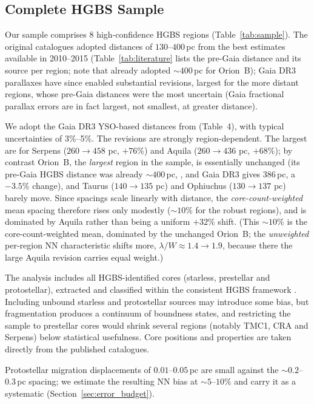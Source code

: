 \documentclass[usenatbib,twoside,twocolumn]{mnras}
\begin{document}
\subsection{Complete HGBS Sample}

Our sample comprises 8 high-confidence HGBS regions (Table~\ref{tab:sample}). The original catalogues \citep{Konyves2015, Konyves2020, Ladjelate2020, Pezzuto2021} adopted distances of $130$--$400$\,pc from the best estimates available in 2010--2015 (Table~\ref{tab:literature} lists the pre-Gaia distance and its source per region; note that \citealt{Konyves2020} already adopted $\sim400$\,pc for Orion~B); Gaia DR3 parallaxes \citep{Zhang2023} have since enabled substantial revisions, largest for the more distant regions, whose pre-Gaia distances were the most uncertain (Gaia fractional parallax errors are in fact largest, not smallest, at greater distance).

We adopt the Gaia DR3 YSO-based distances from \citet{Zhang2023} (Table~4), with typical uncertainties of 3\%--5\%. The revisions are strongly region-dependent. The largest are for Serpens ($260 \to 458$ pc, $+76\%$) and Aquila ($260 \to 436$ pc, $+68\%$); by contrast Orion~B, the \emph{largest} region in the sample, is essentially unchanged (its pre-Gaia HGBS distance was already $\sim400$\,pc, \citealt{Konyves2020}, and Gaia DR3 gives $386$\,pc, a $-3.5\%$ change), and Taurus ($140 \to 135$ pc) and Ophiuchus ($130 \to 137$ pc) barely move. Since spacings scale linearly with distance, the \emph{core-count-weighted} mean spacing therefore rises only modestly ($\sim10\%$ for the robust regions), and is dominated by Aquila rather than being a uniform $+32\%$ shift. (This $\sim10\%$ is the core-count-weighted mean, dominated by the unchanged Orion~B; the \emph{unweighted} per-region NN characteristic shifts more, $\lambda/W\approx1.4\to1.9$, because there the large Aquila revision carries equal weight.)

The analysis includes all HGBS-identified cores (starless, prestellar and protostellar), extracted and classified within the consistent HGBS framework \citep{Konyves2015, Konyves2020}. Including unbound starless and protostellar sources may introduce some bias, but fragmentation produces a continuum of boundness states, and restricting the sample to prestellar cores would shrink several regions (notably TMC1, CRA and Serpens) below statistical usefulness. Core positions and properties are taken directly from the published catalogues.

Protostellar migration displacements of $0.01$--$0.05$\,pc \citep{Kirk2016, Mattern2018} are small against the $\sim0.2$--$0.3$\,pc spacing; we estimate the resulting NN bias at $\sim5$--$10\%$ and carry it as a systematic (Section~\ref{sec:error_budget}).
\end{document}
